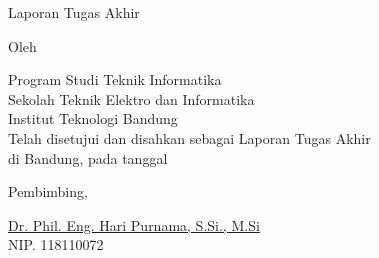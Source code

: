 \clearpage
\pagestyle{empty}

\begin{center}
	\smallskip

	\Large \bfseries \MakeUppercase{\thetitle}
	\vfill

	\Large Laporan Tugas Akhir
	\vfill

	\large Oleh

	\Large \theauthor

	\large Program Studi Teknik Informatika \\

	\normalsize \normalfont
	Sekolah Teknik Elektro dan Informatika \\
	Institut Teknologi Bandung \\

	\vfill
	\normalsize \normalfont
	Telah disetujui dan disahkan sebagai Laporan Tugas Akhir \\
	di Bandung, pada tanggal \tanggalpengesahan

	\vspace{0.5cm}
	Pembimbing,

	\vfill
	\underline{Dr. Phil. Eng. Hari Purnama, S.Si., M.Si
	} \\
	NIP. 118110072

\end{center}
\clearpage

